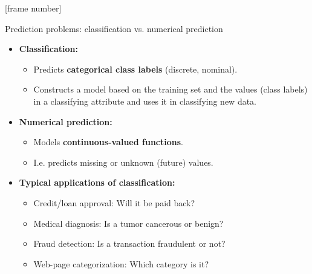 \documentclass[aspectratio=169,t,table]{beamer}
\begin{document}
  {
    [frame number]
    \begin{frame}{Prediction problems: classification vs. numerical prediction}
        \begin{itemize}
            \item \textbf{Classification:}
            \begin{itemize}
              \item Predicts \textbf{\color{airforceblue}categorical class labels} (discrete, nominal).
              \item Constructs a model based on the training set and the values (class labels) in a classifying attribute and uses it in classifying new data.
            \end{itemize}
            \item \textbf{Numerical prediction:}
            \begin{itemize}
              \item Models \textbf{\color{airforceblue}continuous-valued functions}.
              \item I.e. predicts missing or unknown (future) values.
            \end{itemize}
            \item \textbf{Typical applications of classification:}
            \begin{itemize}
              \item Credit/loan approval: Will it be paid back?
              \item Medical diagnosis: Is a tumor cancerous or benign?
              \item Fraud detection: Is a transaction fraudulent or not?
              \item Web-page categorization: Which category is it?
            \end{itemize}
        \end{itemize}
    \end{frame}
  }
\end{document}
